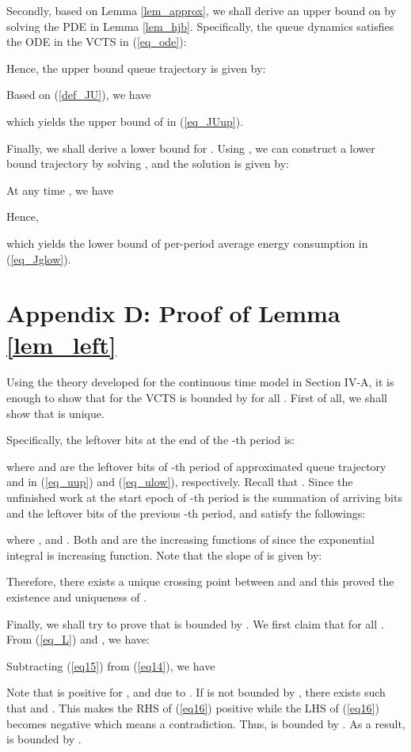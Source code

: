 \documentclass[11pt,journal, onecolumn]{./IEEEtran}
\newcommand{\red}{\color{black}}
\begin{document}
{\red Secondly, based on Lemma \ref{lem_approx}, we shall derive an upper bound on  by solving the PDE in Lemma \ref{lem_hjb}.} Specifically, the queue dynamics  satisfies the ODE in the VCTS in (\ref{eq_ode}):

Hence, the upper bound queue trajectory is given by:

Based on (\ref{def_JU}), we have

which yields the upper bound of  in (\ref{eq_JUup}).

{\red Finally, we shall derive a lower bound for .} Using , we can construct a lower bound trajectory by solving ,
and the solution is given by:


At any time , we have

Hence,

which yields the lower bound of per-period average energy consumption in (\ref{eq_Jglow}).


\section*{Appendix D: Proof of Lemma \ref{lem_left}}\label{app_left}
{\red Using the theory developed for the continuous time model in Section IV-A, it is enough to show that  for the VCTS is bounded by  for all . First of all, we shall show that  is unique.}

{\red Specifically, the leftover bits at the end of the -th period  is:

where  and  are the leftover bits of -th period of approximated queue trajectory  and   in (\ref{eq_uup}) and (\ref{eq_ulow}), respectively. Recall that . Since the unfinished work at the start epoch of -th period is the summation of arriving bits  and the leftover bits of the previous -th period,  and  satisfy the followings:

where , and .
Both  and  are the increasing functions of  since the exponential integral  is increasing function.
Note that the slope of  is given by:

Therefore, there exists a unique crossing point between  and  and this proved the existence and uniqueness of . }

{\red Finally, we shall try to prove that   is bounded by .} We first claim that  for all . From (\ref{eq_L}) and , we have:


Subtracting (\ref{eq15}) from (\ref{eq14}), we have

Note that  is positive for , and  due to . If  is not bounded by , there exists  such that  and . This  makes the RHS of (\ref{eq16}) positive while the LHS of (\ref{eq16}) becomes negative which means a contradiction. Thus,  is bounded by . As a result,  is bounded by .
\end{document}
